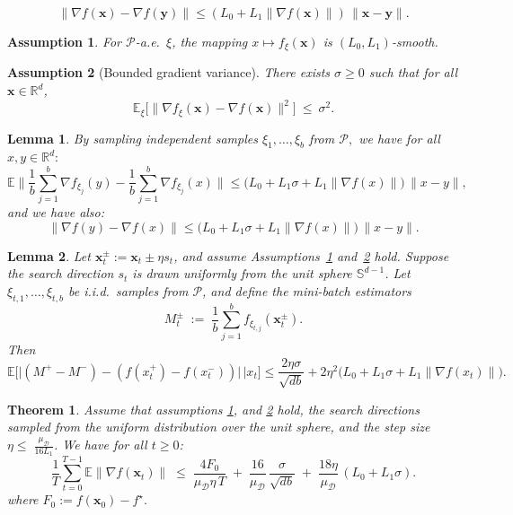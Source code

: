 \documentclass[10pt,a4paper]{amsart}
\newtheorem{assumption}{Assumption}
\newtheorem{theorem}{Theorem}
\newtheorem{lemma}{Lemma}
\def\vx{{\bm{x}}}
\def\vy{{\bm{y}}}
\begin{document}
\begin{equation}
\label{eq:L0L1-smooth}
    \|\nabla f(\vx) - \nabla f(\vy)\|
    \le (L_0 + L_1 \|\nabla f(\vx)\|)\,\|\vx-\vy\|.
\end{equation}

\begin{assumption}\label{ass:smooth_ind}
For $\mathcal{P}$-a.e.\ $\xi$, the mapping $x \mapsto f_{\xi}(\vx)$ is 
$(L_0, L_1)$-smooth.
\end{assumption}

\begin{assumption}[Bounded gradient variance]\label{ass:var_bound}
There exists $\sigma \ge 0$ such that for all $\vx \in \mathbb{R}^d$,
\[
  \mathbb{E}_\xi\!\big[\|\nabla f_{\xi}(\vx)-\nabla f(\vx)\|^2\big]\ \le\ \sigma^2 .
\]
\end{assumption}

\begin{lemma}\label{Lemma:sampling}
By sampling independent samples $\xi_1,\ldots,\xi_b$ from $\mathcal{P},$ we have for all $x,y \in \mathbb{R}^d:$    $$\mathbb{E}\lVert \frac{1}{b}\sum_{j=1}^b \nabla f_{\xi_j}(y) -\frac{1}{b}\sum_{j=1}^b \nabla f_{\xi_j}(x)\rVert\le  \big( L_0+L_1\sigma +L_1 \| \nabla f(x)\| \big)\,\|x-y \|,$$
and we have also:
 $$\lVert \nabla f(y) - \nabla f(x)\rVert\le \big( L_0+L_1\sigma +L_1 \| \nabla f(x)\|\big)\, \|x-y \|.$$
\end{lemma}

\begin{lemma}\label{lem:diff-exp-iso}
Let $\vx_t^\pm := \vx_t \pm \eta s_t$, and assume Assumptions~\ref{ass:smooth_ind} and~\ref{ass:var_bound} hold. 
Suppose the search direction $s_t$ is drawn uniformly from the unit sphere $\mathbb{S}^{d-1}$. 
Let $\xi_{t,1},\ldots,\xi_{t,b}$ be i.i.d.\ samples from $\mathcal{P}$, and define the mini-batch estimators
\[
M_t^\pm \;:=\; \frac{1}{b}\sum_{j=1}^b f_{\xi_{t,j}}(\vx_t^\pm).
\]
Then
$$\mathbb{E}\big[\big|(M^+-M^-) - (f(x_t^+)-f(x_t^-))\big|  \, \big| x_t\big]\le\frac{2\eta \sigma}{\sqrt{db}}+ 2\eta^2\big(L_0+L_1\sigma + L_1\| \nabla f(x_t) \| \big).$$
\end{lemma}

\begin{theorem}\label{lem:indiv-descent}
Assume that assumptions \ref{ass:smooth_ind}, and \ref{ass:var_bound} hold, the search directions sampled from the uniform distribution over the unit sphere, and the step size $
\eta \le \; \frac{\mu_{\mathcal{D}}}{16L_1}
$. We have for all $t \ge 0$:
\[
\frac{1}{T}\sum_{t=0}^{T-1}\mathbb{E}\big\|\nabla f(\vx_t)\big\|
\;\le\;
\frac{4F_0}{\mu_{\mathcal{D}}\eta\,T}
\;+\;\frac{16}{\mu_{\mathcal{D}}}\,\frac{\sigma}{\sqrt{db}}
\;+\;\frac{18\eta}{\mu_{\mathcal{D}}}\,(L_0+L_1\sigma).
\]
where $F_0:=f(\vx_0)-f^\star.$
\end{theorem}
\end{document}
